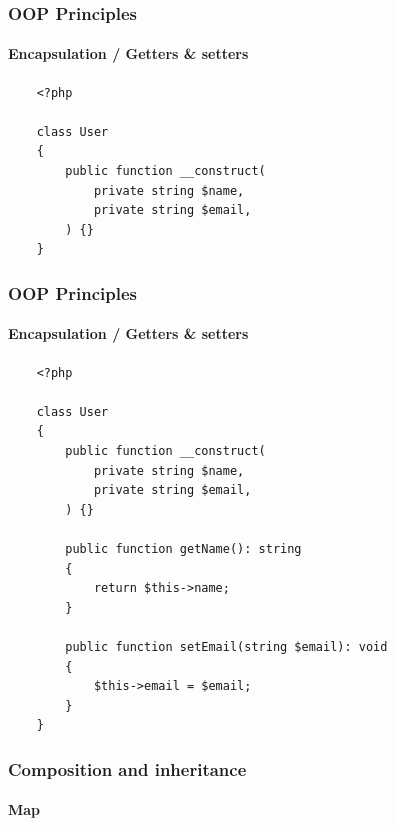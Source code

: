 \begin{frame}[fragile,c]
    \frametitle{OOP Principles}
    \framesubtitle{Encapsulation / Getters \& setters}

    \begin{lstlisting}
    <?php

    class User
    {
        public function __construct(
            private string $name,
            private string $email,
        ) {}
    }
    \end{lstlisting}
\end{frame}

\begin{frame}[fragile,c]
    \frametitle{OOP Principles}
    \framesubtitle{Encapsulation / Getters \& setters}

    \begin{lstlisting}
    <?php

    class User
    {
        public function __construct(
            private string $name,
            private string $email,
        ) {}

        public function getName(): string
        {
            return $this->name;
        }

        public function setEmail(string $email): void
        {
            $this->email = $email;
        }
    }
    \end{lstlisting}
\end{frame}

\begin{frame}[fragile,c]
    \frametitle{Composition and inheritance}
    \framesubtitle{Map}

\end{frame}

